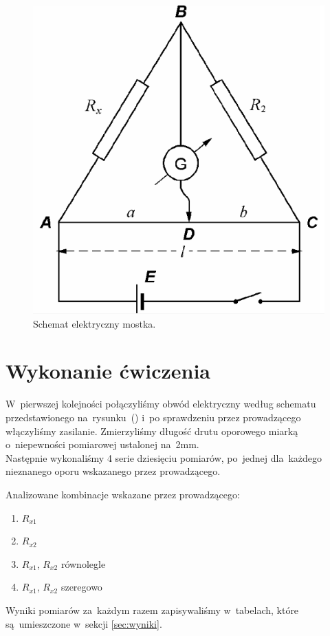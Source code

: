 \documentclass{fizraport}
\begin{document}
\begin{figure}[!htb]
	\centering
	\includegraphics[scale=0.45]{4/mostek.png}
	\caption{ Schemat elektryczny mostka.}
	\label{fig:mostek}
\end{figure}


\section{Wykonanie ćwiczenia}
W~pierwszej kolejności połączyliśmy obwód elektryczny według schematu przedstawionego na~rysunku~() i~po sprawdzeniu
przez prowadzącego włączyliśmy zasilanie. Zmierzyliśmy długość drutu oporowego miarką o~niepewności pomiarowej ustalonej na~2mm.\\
Następnie wykonaliśmy 4 serie dziesięciu pomiarów, po~jednej dla~każdego nieznanego oporu wskazanego przez prowadzącego.

\bigskip
Analizowane kombinacje wskazane przez prowadzącego:
\begin{enumerate}
    \item $R_{x1}$
    \item $R_{x2}$
    \item $R_{x1}$, $R_{x2}$ równolegle
    \item $R_{x1}$, $R_{x2}$ szeregowo
\end{enumerate}
Wyniki pomiarów za~każdym razem zapisywaliśmy w~tabelach, które są~umieszczone w~sekcji \ref{sec:wyniki}.
\end{document}
